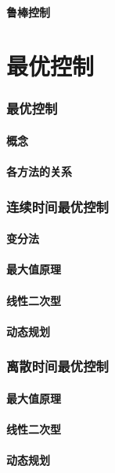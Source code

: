 \documentclass[
12pt, %
a4paper, 
oneside, %
headinclude,footinclude, %
]{scrartcl}
\begin{document}
\subsection[鲁棒控制]{鲁棒控制}
\part{最优控制}
\section{最优控制}
\subsection[概念]{概念}
\subsection[各方法的关系]{各方法的关系}
\section{连续时间最优控制}
\subsection[变分法]{变分法}
\subsection[最大值原理]{最大值原理}
\subsection[线性二次型]{线性二次型}
\subsection[动态规划]{动态规划}
\section{离散时间最优控制}
\subsection[最大值原理]{最大值原理}
\subsection[线性二次型]{线性二次型}
\subsection[动态规划]{动态规划}
\end{document}
